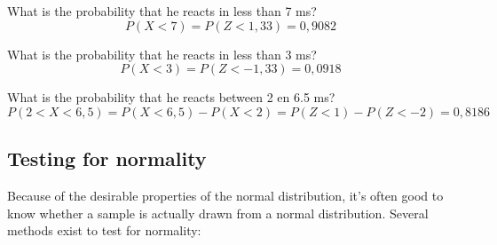 \begin{example}
What is the probability that he reacts in less than 7 ms?
\[ P(X < 7) = P(Z < 1,33) = 0,9082 \]
\end{example}

\begin{example}
What is the probability that he reacts in less than 3 ms?
\[ P(X<3) = P(Z < -1,33) = 0,0918 \]
\end{example}

\begin{example}
What is the probability that he reacts between 2 en 6.5 ms?
\[ P( 2 < X < 6,5) = P(X<6,5) - P(X<2) = P(Z<1) - P(Z<-2) = 0,8186 \]
\end{example}

\subsection{Testing for normality}
\label{ssec:testing-for-normality}

Because of the desirable properties of the normal distribution, it's often good to know whether a sample is actually drawn from a normal distribution. Several methods exist to test for normality:

